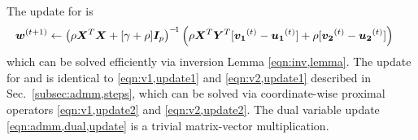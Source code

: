 The update for \w is
\begin{align}
	{\ensuremath{\bm{w}}}^{(t+1)} \leftarrow \left(\rho{\ensuremath{\bm{X}}}^T{\bm{X}} + [\gamma+\rho]\bm{I}_p\right)^{-\!1}  
		\Big(&\rho{\ensuremath{\bm{X}}}^T{\bm{Y}}^T [{\bm{v_1}}^{(t)}-{\bm{u_1}}^{(t)}] 
		+\rho[{\bm{v_2}}^{(t)}-{\bm{u_2}}^{(t)}] \Big) \, \nonumber
\end{align} which can be solved efficiently via inversion Lemma \eqref{eqn:inv,lemma}.
The update for \va and \vb is identical to \eqref{eqn:v1,update1} and \eqref{eqn:v2,update1} described in Sec.~\ref{subsec:admm,steps}, which can be solved via coordinate-wise proximal operators \eqref{eqn:v1,update2} and \eqref{eqn:v2,update2}.
The dual variable update \eqref{eqn:admm,dual,update} is a trivial matrix-vector multiplication.

